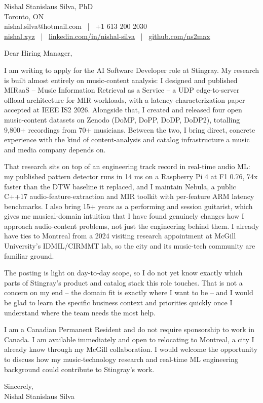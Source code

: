 \documentclass[11pt]{article}
\begin{document}
\pagestyle{empty}

\noindent
Nishal Stanislaus Silva, PhD \\
Toronto, ON \\
nishal.silva@hotmail.com \, | \, +1 613 200 2030 \\
\href{https://nishal.xyz}{nishal.xyz} \, | \, \href{https://www.linkedin.com/in/nishal-silva}{linkedin.com/in/nishal-silva} \, | \, \href{https://github.com/ns2max}{github.com/ns2max}

\vspace{1.5em}
\noindent Dear Hiring Manager,

\vspace{1em}
\noindent I am writing to apply for the AI Software Developer role at Stingray. My research is built almost entirely on music-content analysis: I designed and published MIRaaS -- Music Information Retrieval as a Service -- a UDP edge-to-server offload architecture for MIR workloads, with a latency-characterization paper accepted at IEEE IS2 2026. Alongside that, I created and released four open music-content datasets on Zenodo (DoMP, DoPP, DoDP, DoDP2), totalling 9,800+ recordings from 70+ musicians. Between the two, I bring direct, concrete experience with the kind of content-analysis and catalog infrastructure a music and media company depends on.

\vspace{1em}
\noindent That research sits on top of an engineering track record in real-time audio ML: my published pattern detector runs in 14 ms on a Raspberry Pi 4 at F1 0.76, 74x faster than the DTW baseline it replaced, and I maintain Nebula, a public C++17 audio-feature-extraction and MIR toolkit with per-feature ARM latency benchmarks. I also bring 15+ years as a performing and session guitarist, which gives me musical-domain intuition that I have found genuinely changes how I approach audio-content problems, not just the engineering behind them. I already have ties to Montreal from a 2024 visiting research appointment at McGill University's IDMIL/CIRMMT lab, so the city and its music-tech community are familiar ground.

\vspace{1em}
\noindent The posting is light on day-to-day scope, so I do not yet know exactly which parts of Stingray's product and catalog stack this role touches. That is not a concern on my end -- the domain fit is exactly where I want to be -- and I would be glad to learn the specific business context and priorities quickly once I understand where the team needs the most help.

\vspace{1em}
\noindent I am a Canadian Permanent Resident and do not require sponsorship to work in Canada. I am available immediately and open to relocating to Montreal, a city I already know through my McGill collaboration. I would welcome the opportunity to discuss how my music-technology research and real-time ML engineering background could contribute to Stingray's work.

\vspace{1.5em}
\noindent Sincerely, \\
Nishal Stanislaus Silva
\end{document}
